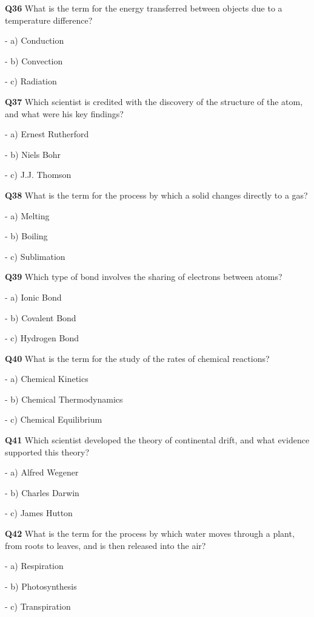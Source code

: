 \textbf{Q36} What is the term for the energy transferred between objects due to a temperature difference?\par
\quad - a) Conduction\par
\quad - b) Convection\par
\quad - c) Radiation\par

\textbf{Q37} Which scientist is credited with the discovery of the structure of the atom, and what were his key findings?\par
\quad - a) Ernest Rutherford\par
\quad - b) Niels Bohr\par
\quad - c) J.J. Thomson\par

\textbf{Q38} What is the term for the process by which a solid changes directly to a gas?\par
\quad - a) Melting\par
\quad - b) Boiling\par
\quad - c) Sublimation\par

\textbf{Q39} Which type of bond involves the sharing of electrons between atoms?\par
\quad - a) Ionic Bond\par
\quad - b) Covalent Bond\par
\quad - c) Hydrogen Bond\par

\textbf{Q40} What is the term for the study of the rates of chemical reactions?\par
\quad - a) Chemical Kinetics\par
\quad - b) Chemical Thermodynamics\par
\quad - c) Chemical Equilibrium\par

\textbf{Q41} Which scientist developed the theory of continental drift, and what evidence supported this theory?\par
\quad - a) Alfred Wegener\par
\quad - b) Charles Darwin\par
\quad - c) James Hutton\par

\textbf{Q42} What is the term for the process by which water moves through a plant, from roots to leaves, and is then released into the air?\par
\quad - a) Respiration\par
\quad - b) Photosynthesis\par
\quad - c) Transpiration\par

